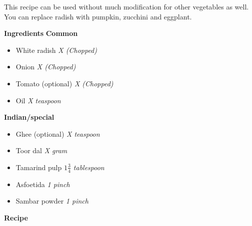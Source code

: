 This recipe can be used without much modification for other vegetables as well. You can replace radish with pumpkin, zucchini and eggplant.

\large{\textbf{Ingredients}}
  \large{\textbf{Common}}
  \begin{itemize}
    \item White radish \quad\quad\quad\quad \textit{X (Chopped)}
    \item Onion \quad\quad\quad\quad \textit{X (Chopped)}
    \item Tomato (optional) \quad\quad\quad\quad \textit{X (Chopped)}
    \item Oil \quad\quad\quad\quad \textit{X teaspoon}
  \end{itemize}
  \large{\textbf{Indian/special}}
  \begin{itemize}
    \item Ghee (optional) \quad\quad\quad\quad \textit{X teaspoon}
    \item Toor dal \quad\quad\quad\quad \textit{X gram}
    \item Tamarind pulp \quad\quad\quad\quad \textit{$1\frac{3}{4}$ tablespoon}
    \item Asfoetida \quad\quad\quad\quad \textit{1 pinch}
    \item Sambar powder \quad\quad\quad\quad \textit{1 pinch}
  \end{itemize}

\large{\textbf{Recipe}}

